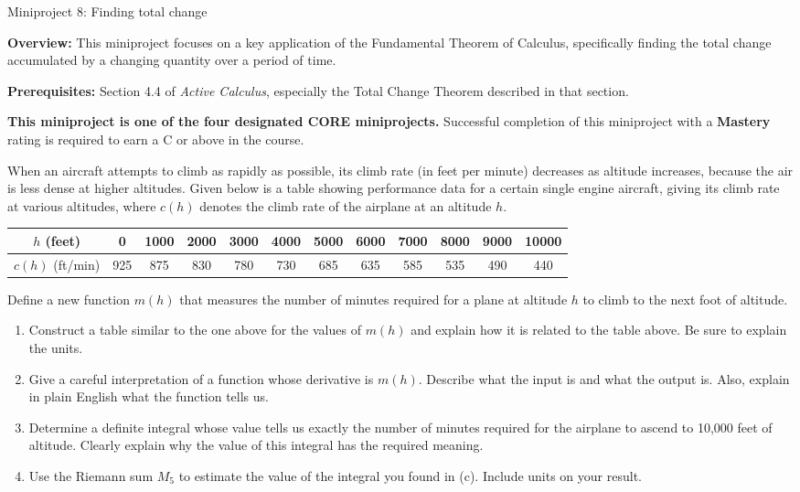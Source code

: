 \documentclass[11pt,letterpaper]{article}
\begin{document}
\begin{flushright}
	\begin{Large}
		Miniproject 8: Finding total change 
	\end{Large}
\end{flushright}

\noindent
\textbf{Overview:} This miniproject focuses on a key application  of the Fundamental Theorem of Calculus, specifically finding the total change accumulated by a changing quantity over a period of time.  

\medskip

\noindent
\textbf{Prerequisites:} Section 4.4 of \emph{Active Calculus}, especially the Total Change Theorem described in that section. 

\medskip

\noindent
\textbf{This miniproject is one of the four designated CORE miniprojects.} Successful completion of this miniproject with a \textbf{Mastery} rating is required to earn a C or above in the course. 	

\hrulefill

When an aircraft attempts to climb as rapidly as possible, its climb rate (in feet per minute) decreases as altitude increases, because the air is less dense at higher altitudes. Given below is a table showing performance data for a certain single engine aircraft, giving its climb rate at various altitudes, where $c(h)$ denotes the climb rate of the airplane at an altitude $h$.

\begin{center}
	\begin{tabular}{c||c|c|c|c|c|c|c|c|c|c|c}
	$h$ (feet) & 0 & 1000 & 2000 & 3000 & 4000 & 5000 & 6000 & 7000 & 8000 & 9000 & 10000 \\ \hline
	$c(h)$ (ft/min) & 925 & 875 & 830 & 780 & 730 & 685 & 635 & 585 & 535 & 490 & 440 
	\end{tabular}
\end{center}
Define a new function $m(h)$ that measures the number of minutes required for a plane at altitude $h$ to climb to the next foot of altitude. 
	\begin{enumerate}
		\item Construct a table similar to the one above for the values of $m(h)$ and explain how it is related to the table above. Be sure to explain the units. 
		\item Give a careful interpretation of a function whose derivative is $m(h)$. Describe what the input is and what the output is. Also, explain in plain English what the function tells us.
		\item Determine a definite integral whose value tells us exactly the number of minutes required for the airplane to ascend to 10,000 feet of altitude. Clearly explain why the value of this integral has the required meaning.
		\item Use the Riemann sum $M_5$ to estimate the value of the integral you found in (c). Include units on your result. 
	\end{enumerate}
\end{document}

